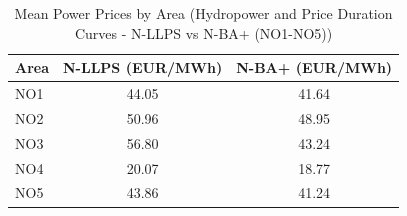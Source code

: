 \begin{table}[htbp]
\centering
\caption{Mean Power Prices by Area (Hydropower and Price Duration Curves - N-LLPS vs N-BA+ (NO1-NO5))}
\label{tab:mean_prices_NO_areas_N_LLPS_vs_N_BA_plus}
\begin{tabular}{lcc}
\hline
Area & N-LLPS (EUR/MWh) & N-BA+ (EUR/MWh) \\
\hline
NO1 & 44.05 & 41.64 \\
NO2 & 50.96 & 48.95 \\
NO3 & 56.80 & 43.24 \\
NO4 & 20.07 & 18.77 \\
NO5 & 43.86 & 41.24 \\
\hline
\end{tabular}
\end{table}